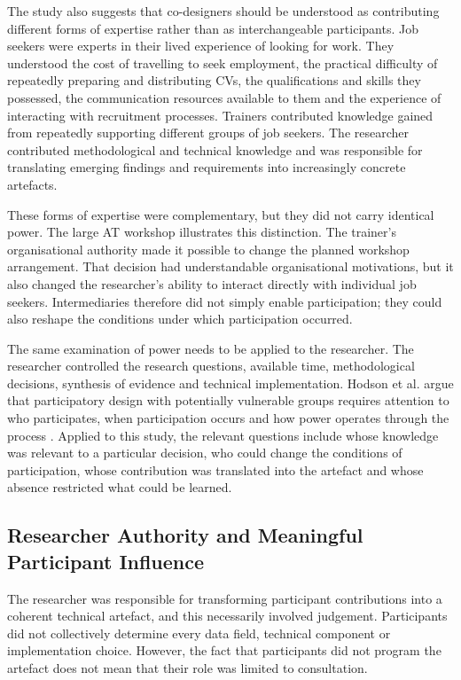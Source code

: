 The study also suggests that co-designers should be understood as contributing different forms of expertise rather than as interchangeable participants. Job seekers were experts in their lived experience of looking for work. They understood the cost of travelling to seek employment, the practical difficulty of repeatedly preparing and distributing CVs, the qualifications and skills they possessed, the communication resources available to them and the experience of interacting with recruitment processes. Trainers contributed knowledge gained from repeatedly supporting different groups of job seekers. The researcher contributed methodological and technical knowledge and was responsible for translating emerging findings and requirements into increasingly concrete artefacts.

These forms of expertise were complementary, but they did not carry identical power. The large AT workshop illustrates this distinction. The trainer's organisational authority made it possible to change the planned workshop arrangement. That decision had understandable organisational motivations, but it also changed the researcher's ability to interact directly with individual job seekers. Intermediaries therefore did not simply enable participation; they could also reshape the conditions under which participation occurred.

The same examination of power needs to be applied to the researcher. The researcher controlled the research questions, available time, methodological decisions, synthesis of evidence and technical implementation. Hodson et al. argue that participatory design with potentially vulnerable groups requires attention to who participates, when participation occurs and how power operates through the process \cite{hodson2023}. Applied to this study, the relevant questions include whose knowledge was relevant to a particular decision, who could change the conditions of participation, whose contribution was translated into the artefact and whose absence restricted what could be learned.


\subsection{Researcher Authority and Meaningful Participant Influence}

The researcher was responsible for transforming participant contributions into a coherent technical artefact, and this necessarily involved judgement. Participants did not collectively determine every data field, technical component or implementation choice. However, the fact that participants did not program the artefact does not mean that their role was limited to consultation.

